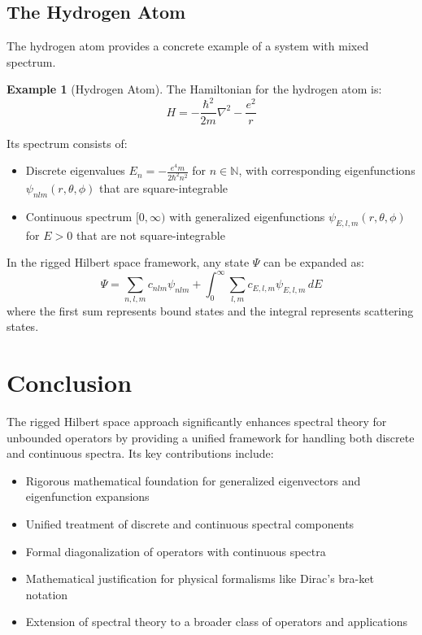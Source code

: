 \documentclass[12pt,a4paper]{article}
\theoremstyle{definition}
\newtheorem{example}{Example}
\begin{document}
\subsection{The Hydrogen Atom}

The hydrogen atom provides a concrete example of a system with mixed spectrum.

\begin{example}[Hydrogen Atom]
The Hamiltonian for the hydrogen atom is:
\begin{equation}
    H = -\frac{\hbar^2}{2m}\nabla^2 - \frac{e^2}{r}
\end{equation}

Its spectrum consists of:
\begin{itemize}
    \item Discrete eigenvalues $E_n = -\frac{e^4m}{2\hbar^2n^2}$ for $n \in \mathbb{N}$, with corresponding eigenfunctions $\psi_{nlm}(r,\theta,\phi)$ that are square-integrable
    \item Continuous spectrum $[0,\infty)$ with generalized eigenfunctions $\psi_{E,l,m}(r,\theta,\phi)$ for $E > 0$ that are not square-integrable
\end{itemize}

In the rigged Hilbert space framework, any state $\Psi$ can be expanded as:
\begin{equation}
    \Psi = \sum_{n,l,m} c_{nlm} \psi_{nlm} + \int_0^{\infty} \sum_{l,m} c_{E,l,m} \psi_{E,l,m} \, dE
\end{equation}
where the first sum represents bound states and the integral represents scattering states.
\end{example}

\section{Conclusion}

The rigged Hilbert space approach significantly enhances spectral theory for unbounded operators by providing a unified framework for handling both discrete and continuous spectra. Its key contributions include:

\begin{itemize}
    \item Rigorous mathematical foundation for generalized eigenvectors and eigenfunction expansions
    \item Unified treatment of discrete and continuous spectral components
    \item Formal diagonalization of operators with continuous spectra
    \item Mathematical justification for physical formalisms like Dirac's bra-ket notation
    \item Extension of spectral theory to a broader class of operators and applications
\end{itemize}
\end{document}
